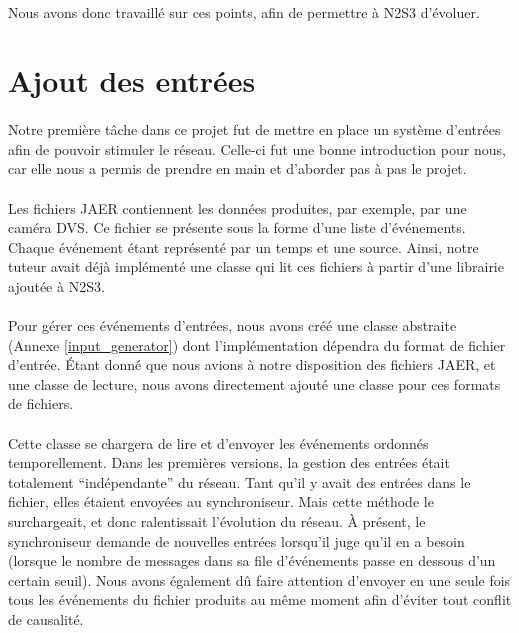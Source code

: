 \documentclass[a4paper,10pt]{article}
\begin{document}
\paragraph{}
Nous avons donc travaillé sur ces points, afin de permettre à N2S3 d’évoluer.

\newpage

\section{Ajout des entrées}

\paragraph{}
Notre première tâche dans ce projet fut de mettre en place un système d'entrées afin de pouvoir stimuler le réseau. Celle-ci fut une bonne introduction pour nous, car elle nous a permis de prendre en main et d’aborder pas à pas le projet.

\paragraph{}
Les fichiers JAER contiennent les données produites, par exemple, par une caméra DVS. Ce fichier se présente sous la forme d’une liste d’événements. Chaque événement étant représenté par un temps et une source. Ainsi, notre tuteur avait déjà implémenté une classe qui lit ces fichiers à partir d’une librairie ajoutée à N2S3. 

\paragraph{}
Pour gérer ces événements d’entrées, nous avons créé une classe abstraite (Annexe \ref{input_generator}) dont l’implémentation dépendra du format de fichier d’entrée. Étant donné que nous avions à notre disposition des fichiers JAER, et une classe de lecture, nous avons directement ajouté une classe pour ces formats de fichiers.

\paragraph{}
Cette classe se chargera de lire et d'envoyer les événements ordonnés temporellement. Dans les premières versions, la gestion des entrées était totalement “indépendante” du réseau. Tant qu’il y avait des entrées dans le fichier, elles étaient envoyées au synchroniseur. Mais cette méthode le surchargeait, et donc ralentissait l’évolution du réseau. À présent, le synchroniseur demande de nouvelles entrées lorsqu’il juge qu’il en a besoin (lorsque le nombre de messages dans sa file d'événements passe en dessous d'un certain seuil). Nous avons également dû faire attention d'envoyer en une seule fois tous les événements du fichier produits au même moment afin d'éviter tout conflit de causalité.
\end{document}
